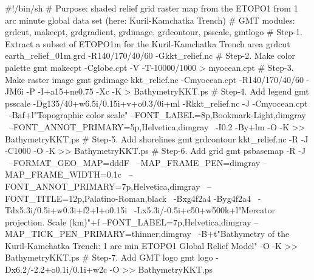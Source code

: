 #!/bin/sh
# Purpose: shaded relief grid raster map from the ETOPO1 from 1 arc minute global data set (here: Kuril-Kamchatka Trench)
# GMT modules: grdcut, makecpt, grdgradient, grdimage, grdcontour, psscale, gmtlogo
# Step-1. Extract a subset of ETOPO1m for the Kuril-Kamchatka Trench area 
grdcut earth_relief_01m.grd -R140/170/40/60 -Gkkt_relief.nc
# Step-2. Make color palette 
gmt makecpt -Cglobe.cpt -V -T-10000/1000 > myocean.cpt
# Step-3. Make raster image
gmt grdimage kkt_relief.nc -Cmyocean.cpt -R140/170/40/60 -JM6i -P -I+a15+ne0.75 -Xc -K > BathymetryKKT.ps
# Step-4. Add legend
gmt psscale -Dg135/40+w6.5i/0.15i+v+o0.3/0i+ml -Rkkt_relief.nc -J -Cmyocean.cpt \
	-Baf+l"Topographic color scale" --FONT_LABEL=8p,Bookmark-Light,dimgray \
	--FONT_ANNOT_PRIMARY=5p,Helvetica,dimgray \
	-I0.2 -By+lm -O -K >> BathymetryKKT.ps	
# Step-5. Add shorelines
gmt grdcontour kkt_relief.nc -R -J -C1000 -O -K >> BathymetryKKT.ps
# Step-6. Add grid
gmt psbasemap -R -J \
	--FORMAT_GEO_MAP=dddF \
	--MAP_FRAME_PEN=dimgray --MAP_FRAME_WIDTH=0.1c \
	--FONT_ANNOT_PRIMARY=7p,Helvetica,dimgray \
	--FONT_TITLE=12p,Palatino-Roman,black \
	-Bxg4f2a4 -Byg4f2a4 \
	-Tdx5.3i/0.5i+w0.3i+f2+l+o0.15i \
	-Lx5.3i/-0.5i+c50+w500k+l"Mercator projection. Scale (km)"+f --FONT_LABEL=7p,Helvetica,dimgray --MAP_TICK_PEN_PRIMARY=thinner,dimgray \
	-B+t"Bathymetry of the Kuril-Kamchatka Trench: 1 arc min ETOPO1 Global Relief Model" -O -K >> BathymetryKKT.ps
# Step-7. Add GMT logo
gmt logo -Dx6.2/-2.2+o0.1i/0.1i+w2c -O >> BathymetryKKT.ps